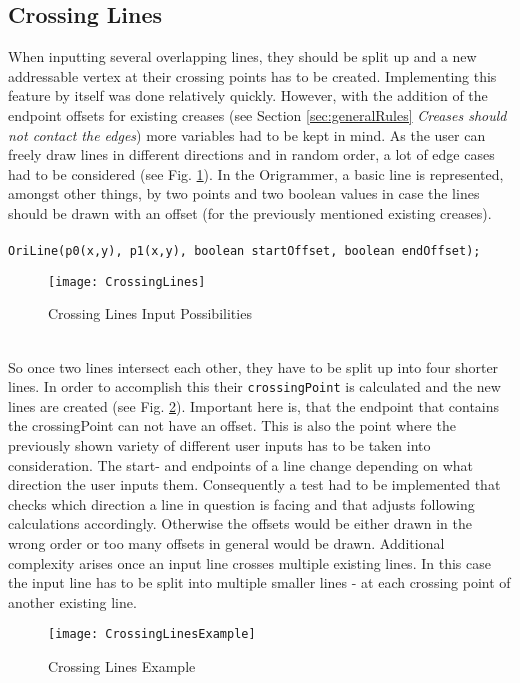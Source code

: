 \subsection{Crossing Lines}

When inputting several overlapping lines, they should be split up and a new addressable vertex at their crossing points has to be created. Implementing this feature by itself was done relatively quickly. However, with the addition of the endpoint offsets for existing creases (see Section \ref{sec:generalRules} \emph{Creases should not contact the edges}) more variables had to be kept in mind. As the user can freely draw lines in different directions and in random order, a lot of edge cases had to be considered (see Fig. \ref{fig:crossingLines}). In the Origrammer, a basic line is represented, amongst other things,  by two points and two boolean values in case the lines should be drawn with an offset (for the previously mentioned existing creases).\\
\\
\texttt{OriLine(p0(x,y), p1(x,y), boolean startOffset, boolean endOffset);}
\begin{figure}[h]
	\centering
	\texttt{[image: CrossingLines]}
	\caption{Crossing Lines Input Possibilities}
	\label{fig:crossingLines}
\end{figure}\\
So once two lines intersect each other, they have to be split up into four shorter lines. In order to accomplish this their \texttt{crossingPoint} is calculated and the new lines are created (see Fig. \ref{fig:crossingLinesExample}). Important here is, that the endpoint that contains the crossingPoint can not have an offset. This is also the point where the previously shown variety of different user inputs has to be taken into consideration. The start- and endpoints of a line change depending on what direction the user inputs them. Consequently a test had to be implemented that checks which direction a line in question is facing and that adjusts following calculations accordingly. Otherwise the offsets would be either drawn in the wrong order or too many offsets in general would be drawn. Additional complexity arises once an input line crosses multiple existing lines. In this case the input line has to be split into multiple smaller lines - at each crossing point of another existing line.

\begin{figure}[h]
	\centering
	\texttt{[image: CrossingLinesExample]}
	\caption{Crossing Lines Example}
	\label{fig:crossingLinesExample}
\end{figure}

						
